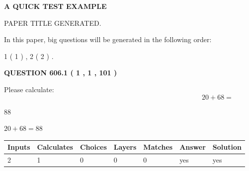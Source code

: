 \documentclass[12pt]{article}
\begin{document}
   
   
   
   
   
 \vspace{0.2in}
{\LARGE {\textbf{ A QUICK TEST EXAMPLE}}}
   
   
 PAPER TITLE GENERATED.
   
   
   
\vspace{0.2in}
   
In this paper, big questions will be generated in the following order: 
   
   
   1 ( 1 )
 ,
   2 ( 2 )
 .
  
\vspace{0.2in}
  
{\textbf{\Large{QUESTION
606.1 
 ( 1 , 1 , 101 )
}}}
  
  
 
Please calculate:
\begin{equation}
20 +  %
68 = \nonumber
\end{equation}
 
 
 
\noindent{}
 
 

88
 
 
\noindent{}
 
 

 
 
 
\noindent{}
 
 

$ %
20 +  %
68=   %
88$
 
 
\noindent{}
 
 

 
   
   
   
   
\noindent\begin{tabular}{|l|l|l|l|l|l|l|}
 \hline
Inputs & Calculates & Choices & Layers & Matches & Answer & Solution \\ \hline
 2  & 
 1  & 
 0
  & 
 0  & 
 0  & 
  yes & 
  yes 
  \\ \hline
 \end{tabular}
   
   
   
\end{document}
